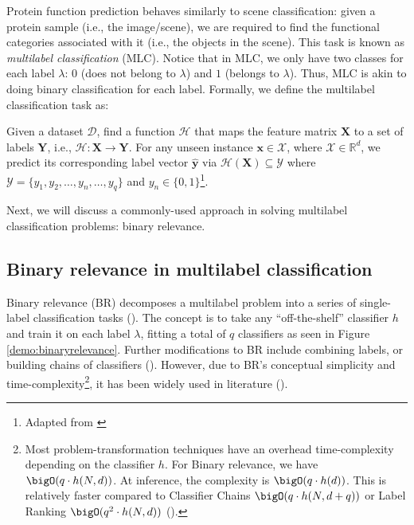 \newpage
\par Protein function prediction behaves similarly to scene classification:
given a protein sample (i.e., the image/scene), we are required to find the
functional categories associated with it (i.e., the objects in the scene).
This task is known as \textit{multilabel classification} (MLC). Notice that
in MLC, we only have two classes for each label $\lambda$: $0$ (does not
belong to $\lambda$) and $1$ (belongs to $\lambda$). Thus, MLC is akin to
doing binary classification for each label. Formally, we define the multilabel
classification task as:

\begin{definition}{}
Given a dataset $\mathcal{D}$, find a function $\mathcal{H}$ that maps the
feature matrix $\mathbf{X}$ to a set of labels $\mathbf{Y}$, i.e.,
$\mathcal{H}: \mathbf{X} \rightarrow \mathbf{Y}$. For any unseen instance
$\mathbf{x} \in \mathcal{X}$, where $\mathcal{X} \in \mathbb{R}^d$, we
predict its corresponding label vector $\mathbf{\widehat{y}}$ via
$\mathcal{H}(\mathbf{X}) \subseteq \mathcal{Y}$ where $\mathcal{Y} = \{y_1,
y_2, \dots, y_n, \dots, y_q\}$ and $y_n \in \{0,1\}$\footnote{Adapted from
\cite{zhang2014review}}.
\end{definition}

\par Next, we will discuss a commonly-used approach in solving multilabel
classification problems: binary relevance.

\subsection{Binary relevance in multilabel classification}

\par Binary relevance (BR) decomposes a multilabel problem into a series of
single-label classification tasks (\cite{godbole2004discriminative,
tsoumakas2007multilabel}). The concept is to take any ``off-the-shelf''
classifier $h$ and train it on each label $\lambda$, fitting a total of $q$
classifiers as seen in Figure \ref{demo:binaryrelevance}. Further
modifications to BR include combining labels, or building chains of
classifiers (\cite{read2009classifier}). However, due to BR's conceptual
simplicity and time-complexity\footnote[2]{
    Most problem-transformation techniques have an overhead time-complexity
    depending on the classifier $h$. For Binary relevance, we have $\bigO(q
    \cdot h(N, d))$. At inference, the complexity is $\bigO(q
    \cdot h(d))$. This is relatively faster compared to Classifier Chains
    $\bigO(q \cdot h(N, d + q))$ or Label Ranking $\bigO(q^{2} \cdot h(N, d))$
    (\cite{zhang2014review}).
}, it has been widely used in literature (\cite{zhang2017binary}).

